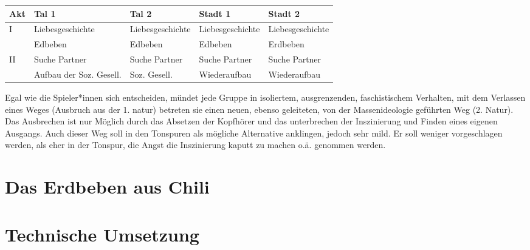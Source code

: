 \documentclass[a4paper, 12pt]{article}
\begin{document}
\begin{flushleft}
\begin{tabular}{p{1cm}|p{3cm}*{3}{|p{3cm}}}
\textbf{Akt} & \textbf{Tal 1} & \textbf{Tal 2} & \textbf{Stadt 1} & \textbf{Stadt 2} \\
\hline
I   & Liebesgeschichte & Liebesgeschichte & Liebesgeschichte & Liebesgeschichte \\
\hline
    & Edbeben & Edbeben & Edbeben & Erdbeben \\
\hline
II  & Suche Partner & Suche Partner & Suche Partner & Suche Partner \\
\hline
    & Aufbau der Soz. Gesell. & Soz. Gesell. & Wiederaufbau & Wiederaufbau \\
\end{tabular}
\end{flushleft}

Egal wie die Spieler*innen sich entscheiden, mündet jede Gruppe in isoliertem, ausgrenzenden, faschistischem Verhalten, mit dem Verlassen eines Weges (Ausbruch aus der 1. natur) betreten sie einen neuen, ebenso geleiteten, von der Massenideologie geführten Weg (2. Natur).
Das Ausbrechen ist nur Möglich durch das Absetzen der Kopfhörer und das unterbrechen der Inszinierung und Finden eines eigenen Ausgangs.
Auch dieser Weg soll in den Tonspuren als mögliche Alternative anklingen, jedoch sehr mild.
Er soll weniger vorgeschlagen werden, als eher in der Tonspur, die Angst \glqq die Inszinierung kaputt zu machen\grqq{} o.ä. genommen werden.


\section{Das Erdbeben aus Chili}

\section{Technische Umsetzung}\label{technische_umsetzung}
   
\printbibliography
 
\end{document}
